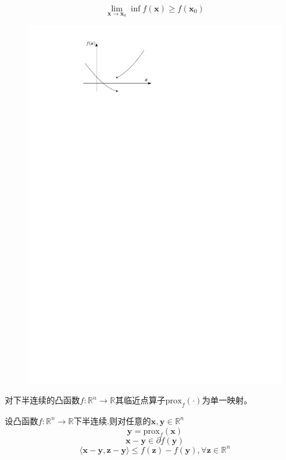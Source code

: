 \begin{definition}[下半连续]
    \[
        \lim_{\boldsymbol{x}\to\boldsymbol{x}_0}\inf f(\boldsymbol{x})\geqslant f(\boldsymbol{x}_0)
    \]
    \begin{figure}[htbp]
        \centering
        \includegraphics{image/下半连续.pdf}
    \end{figure}
\end{definition}
\begin{theorem}
    对下半连续的凸函数$f:\mathbb{R}^n\to\mathbb{R}$其临近点算子$\mathrm{prox}_{f}(\cdot)$为单一映射。
\end{theorem}
\begin{theorem}
    设凸函数$f:\mathbb{R}^n\to\mathbb{R}$下半连续.则对任意的$\boldsymbol{x},\boldsymbol{y}\in \mathbb{R}^{n}$ 
    \[
        \boldsymbol{y}=\mathrm{prox}_f(\boldsymbol{x})
    \]         
    \[
        \boldsymbol{x}-\boldsymbol{y}\in\partial f(\boldsymbol{y})
    \]
    \[
        \langle \boldsymbol{x}-\boldsymbol{y},\boldsymbol{z}-\boldsymbol{y}\rangle\leqslant f(\boldsymbol{z})-f(\boldsymbol{y}),\forall \boldsymbol{z}\in \mathbb{R}^{n}
    \]
\end{theorem}
